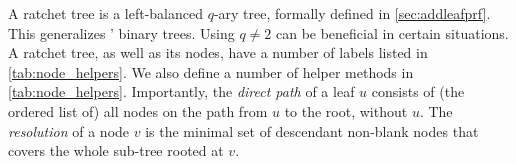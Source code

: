 A ratchet tree is a left-balanced $q$-ary tree, formally defined in \cref{sec:addleafprf}. This generalizes \protITK' binary trees. Using $q\neq2$ can be beneficial in certain situations.
A ratchet tree, as well as its nodes, have a number of labels listed in \cref{tab:node_helpers}.
We also define a number of helper methods in \cref{tab:node_helpers}.
%
Importantly, the \emph{direct path} of a leaf $u$ consists of (the ordered list of) all nodes on the path from $u$ to the root, without $u$.
The \emph{resolution} of a node $v$ is the minimal set of descendant non-blank nodes that covers the whole sub-tree rooted at $v$. %


